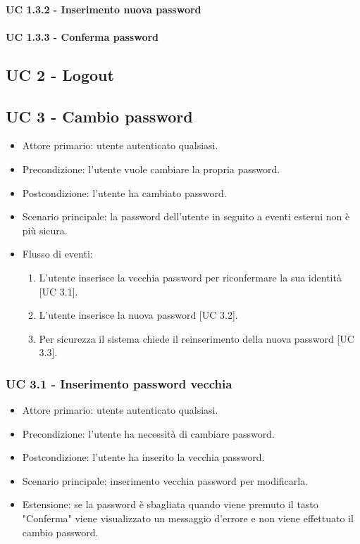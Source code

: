         \paragraph*{UC 1.3.2 - Inserimento nuova password}
        \paragraph*{UC 1.3.3 - Conferma password}
\subsection*{UC 2 - Logout} %
\subsection*{UC 3 - Cambio password}
    \begin{itemize}
        \item Attore primario: utente autenticato qualsiasi.
        \item Precondizione: l'utente vuole cambiare la propria password.
        \item Postcondizione: l'utente ha cambiato password.
        \item Scenario principale: la password dell'utente in seguito a eventi esterni non è più sicura.
        \item Flusso di eventi:
            \begin{enumerate}
                \item L'utente inserisce la vecchia password per riconfermare la sua identità [UC 3.1].
                \item L'utente inserisce la nuova password [UC 3.2].
                \item Per sicurezza il sistema chiede il reinserimento della nuova password [UC 3.3].
            \end{enumerate}
    \end{itemize}
    \subsubsection*{UC 3.1 - Inserimento password vecchia}
        \begin{itemize}
            \item Attore primario: utente autenticato qualsiasi.
            \item Precondizione: l'utente ha necessità di cambiare password.
            \item Postcondizione: l'utente ha inserito la vecchia password.
            \item Scenario principale: inserimento vecchia password per modificarla.
            \item Estensione: se la password è sbagliata quando viene premuto il tasto "Conferma" viene visualizzato un messaggio d'errore e non viene effettuato il cambio password.
        \end{itemize}

